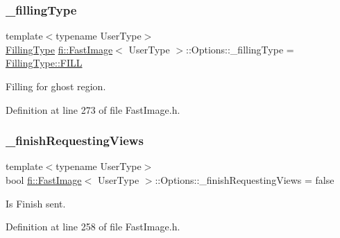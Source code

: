\subsubsection{\texorpdfstring{\+\_\+filling\+Type}{\_fillingType}}
{\footnotesize\ttfamily template$<$typename User\+Type$>$ \\
\hyperlink{namespacefi_a6808b618c85d179a330ca388162215bd}{Filling\+Type} \hyperlink{classfi_1_1FastImage}{fi\+::\+Fast\+Image}$<$ User\+Type $>$\+::Options\+::\+\_\+filling\+Type = \hyperlink{namespacefi_a6808b618c85d179a330ca388162215bdae8225b11842409df543692aebed34fd1}{Filling\+Type\+::\+F\+I\+LL}\hspace{0.3cm}{\ttfamily [private]}}



Filling for ghost region. 



Definition at line 273 of file Fast\+Image.\+h.

\mbox{\label{classfi_1_1FastImage_1_1Options_a1a0a6ab982226db16e8cddd79f7aafcb}} 
\subsubsection{\texorpdfstring{\+\_\+finish\+Requesting\+Views}{\_finishRequestingViews}}
{\footnotesize\ttfamily template$<$typename User\+Type$>$ \\
bool \hyperlink{classfi_1_1FastImage}{fi\+::\+Fast\+Image}$<$ User\+Type $>$\+::Options\+::\+\_\+finish\+Requesting\+Views = false\hspace{0.3cm}{\ttfamily [private]}}



Is Finish sent. 



Definition at line 258 of file Fast\+Image.\+h.

\mbox{\label{classfi_1_1FastImage_1_1Options_ab49c32b1b30543e864a059d710f8edf8}} 
